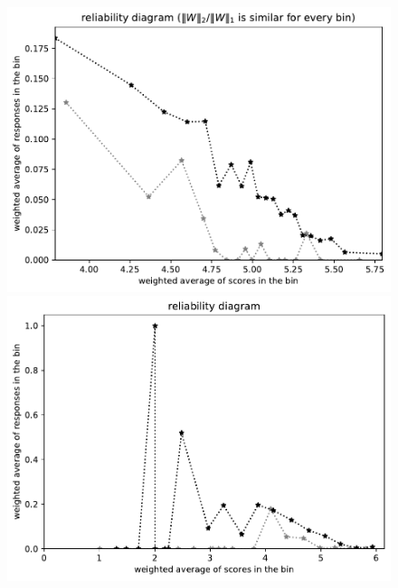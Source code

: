 \documentclass{article}
\newlength{\vertsep}
\newlength{\imsize}
\begin{document}
\begin{figure}
\begin{centering}
\parbox{\imsize}{\includegraphics[width=\imsize]
{../codes/weighted/County_of_Alameda_vs_Placer-LNGI/equierrs20.pdf}}
\quad\quad
\parbox{\imsize}{\includegraphics[width=\imsize]
{../codes/weighted/County_of_Alameda_vs_Placer-LNGI/equiscores20.pdf}}

\vspace{\vertsep}


\end{centering}
\end{figure}
\end{document}
